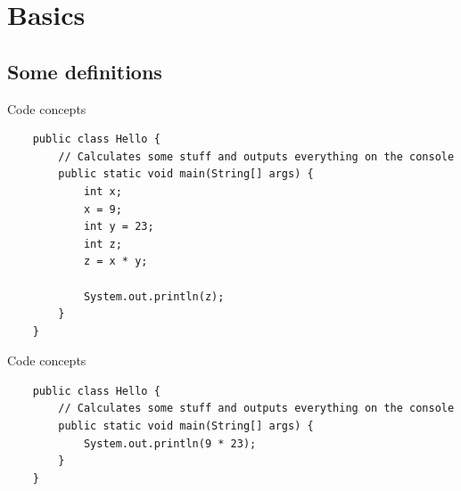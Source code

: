 % 

\section{Basics}

\subsection{Some definitions}

\begin{frame}[fragile]{Code concepts}
	\begin{lstlisting}
	public class Hello {
	    // Calculates some stuff and outputs everything on the console
	    public static void main(String[] args) {	        
	        int x;
	        x = 9;
	        int y = 23;
	        int z;
	        z = x * y;
	        
	        System.out.println(z);
	    }
	}
	\end{lstlisting}
\end{frame}

\begin{frame}[fragile]{Code concepts}
	\begin{lstlisting}
	public class Hello {
	    // Calculates some stuff and outputs everything on the console
	    public static void main(String[] args) {	        
	        System.out.println(9 * 23);
	    }
	}
	\end{lstlisting}
\end{frame}

